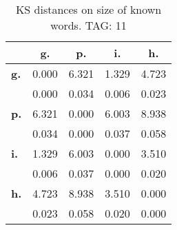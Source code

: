 \begin{table}[h!]
\begin{center}
\begin{tabular}{| l || c | c | c | c |}\hline
 & {\bf g.} & {\bf p.} & {\bf i.} & {\bf h.} \\\hline\hline
{\bf g.} & 0.000 & 6.321 & 1.329 & 4.723 \\
{\bf } & 0.000 & 0.034 & 0.006 & 0.023 \\\hline
{\bf p.} & 6.321 & 0.000 & 6.003 & 8.938 \\
{\bf } & 0.034 & 0.000 & 0.037 & 0.058 \\\hline
{\bf i.} & 1.329 & 6.003 & 0.000 & 3.510 \\
{\bf } & 0.006 & 0.037 & 0.000 & 0.020 \\\hline
{\bf h.} & 4.723 & 8.938 & 3.510 & 0.000 \\
{\bf } & 0.023 & 0.058 & 0.020 & 0.000 \\\hline
\end{tabular}
\caption{KS distances on size of known words. TAG: 11}
\end{center}
\end{table}